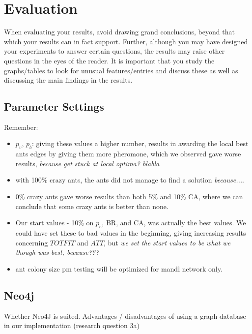 \section{Evaluation}

When evaluating your results, avoid drawing grand conclusions, beyond that which your results can in fact support. Further, although you may have designed your experiments to answer certain questions, the results may raise other questions in the eyes of the reader. It is important that you study the graphs/tables to look for unusual features/entries and discuss these as well as discussing the main findings in the results. 

\subsection{Parameter Settings}
Remember:
\begin{itemize}
\item $p_v$, $p_b$: giving these values a higher number, results in awarding the local best ants edges by giving them more pheromone, which we observed gave worse results, \emph{\color{red}because get stuck at local optima? blabla}
\item with 100\% crazy ants, the ants did not manage to find a solution \emph{\color{red}because...}. 
\item 0\% crazy ants gave worse results than both 5\% and 10\% CA, where we can conclude that some crazy ants is better than none. 
\item Our start values - 10\% on $p_e$, BR, and CA, was actually the best values. We could have set these to bad values in the beginning, giving increasing results concerning $TOTFIT$ and $ATT$, but \emph{\color{red} we set the start values to be what we though was best, because???}
\item ant colony size pm testing will be optimized for mandl network only.
\end{itemize}

\subsection{Neo4j}

Whether Neo4J is suited. Advantages / disadvantages of using a graph database in our implementation (research question 3a)